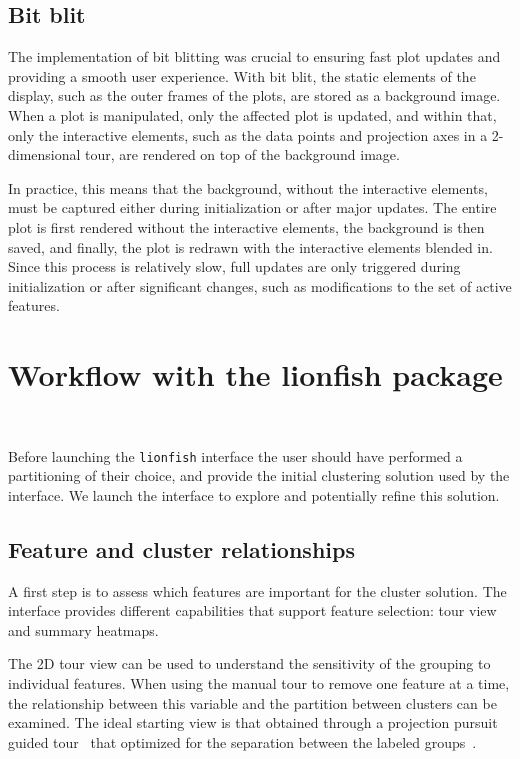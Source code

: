 \documentclass[article]{ajs}
\begin{document}
\subsection{Bit blit}

The implementation of bit blitting was crucial to ensuring fast plot updates and providing a smooth user experience. With bit blit, the static elements of the display, such as the outer frames of the plots, are stored as a background image. When a plot is manipulated, only the affected plot is updated, and within that, only the interactive elements, such as the data points and projection axes in a 2-dimensional tour, are rendered on top of the background image.

In practice, this means that the background, without the interactive elements, must be captured either during initialization or after major updates. The entire plot is first rendered without the interactive elements, the background is then saved, and finally, the plot is redrawn with the interactive elements blended in. Since this process is relatively slow, full updates are only triggered during initialization or after significant changes, such as modifications to the set of active features.

\section{Workflow with the lionfish package}~\label{workflow}

Before launching the \texttt{lionfish} interface the user should have performed a partitioning of their choice, and provide the initial clustering solution used by the interface. We launch the interface to explore and potentially refine this solution.

\subsection{Feature and cluster relationships}

A first step is to assess which features are important for the cluster solution. The interface provides different capabilities that support feature selection: tour view and summary heatmaps. 

The 2D tour view can be used to understand the sensitivity of the grouping to individual features. When using the manual tour to remove one feature at a time, the relationship between this variable and the partition between clusters can be examined. The ideal starting view is that obtained through a projection pursuit guided tour~\citep{CBCH94} that optimized for the separation between the labeled groups~\citep{lckl2005}.
\end{document}
